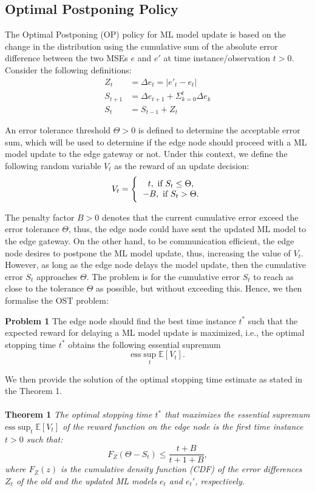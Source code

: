 \documentclass{mpaper}
\begin{document}
\subsection{Optimal Postponing Policy}
The Optimal Postponing (OP) policy for ML model update is based on the change in the distribution using the cumulative sum of the absolute error difference between the two MSEs $e$ and $e'$ at time instance/observation $t>0$. Consider the following definitions:
\begin{align}
    Z_t &= \Delta e_t = | e'_t - e_t |\\
    S_{t+1} &= \Delta e_{t+1} + \Sigma_{k=0}^t \Delta e_k\\
    S_t &= S_{t-1} + Z_t\label{eq:1}
\end{align}

An error tolerance threshold $\Theta > 0$ is defined to determine the acceptable error sum, which will be used to determine if the 
edge node should proceed with a ML model update to the edge gateway or not. Under this context, we define the following random variable $V_{t}$ as the reward of an update decision:
\begin{equation}\label{reward}
    V_t = \Bigg\{ \begin{tabular}{c}
                  $t,\ \text{if}\ S_t \leq \Theta$, \\
                  $-B,\ \text{if}\ S_t > \Theta.$
                  \end{tabular}
\end{equation}

The penalty factor $B> 0$ denotes that the current cumulative error exceed the error tolerance $\Theta$, thus, the edge node could have sent the updated ML model to the edge gateway. On the other hand, to be communication efficient, the edge node desires to postpone the ML model update, thus, increasing the value of $V_{t}$. However, as long as the edge node delays the model update, then the cumulative error $S_{t}$ approaches $\Theta$. The problem is for the cumulative error $S_{t}$ to reach as close to the tolerance $\Theta$ as possible, but without exceeding this. Hence, we then formalise the OST problem:

\textbf{Problem 1} The edge node should find the best time instance $t^{*}$ such that the expected reward for delaying a ML model update is maximized, i.e., the optimal stopping time $t^{*}$ obtains the following essential supremum
\[
\mbox{ess} \sup_{t} \mathbb{E}[V_{t}].
\]

We then provide the solution of the optimal stopping time estimate as stated in the Theorem 1.
\\
\\
\textbf{Theorem 1}\textit{
The optimal stopping time $t^{*}$ that maximizes the essential supremum $\mbox{ess} \sup_{t} \mathbb{E}[V_{t}]$ of the reward function on the edge node is the first time instance $t>0$ such that:
\[
F_{Z}(\Theta - S_{t}) \leq \frac{t+B}{t+1+B},
\]
where $F_{Z}(z)$ is the cumulative density function (CDF) of the error differences $Z_{t}$ of the old and the updated ML models $e_{t}$ and $e_{t}'$, respectively.}  
\\
\end{document}

